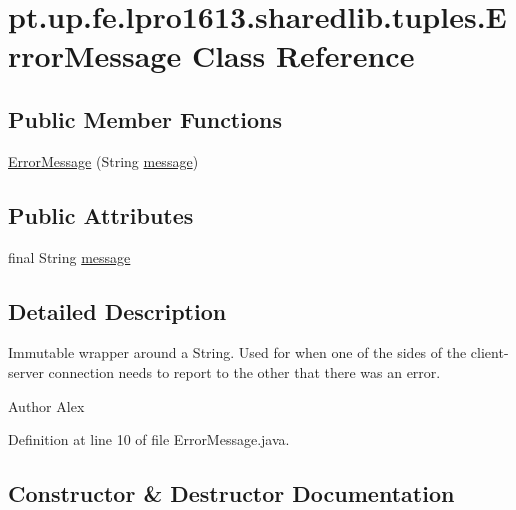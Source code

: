 \hypertarget{classpt_1_1up_1_1fe_1_1lpro1613_1_1sharedlib_1_1tuples_1_1_error_message}{}\section{pt.\+up.\+fe.\+lpro1613.\+sharedlib.\+tuples.\+Error\+Message Class Reference}
\label{classpt_1_1up_1_1fe_1_1lpro1613_1_1sharedlib_1_1tuples_1_1_error_message}
\subsection*{Public Member Functions}
\begin{DoxyCompactItemize}
\item 
\hyperlink{classpt_1_1up_1_1fe_1_1lpro1613_1_1sharedlib_1_1tuples_1_1_error_message_ad4c66717ed7a7524c12b7f63ef799a92}{Error\+Message} (String \hyperlink{classpt_1_1up_1_1fe_1_1lpro1613_1_1sharedlib_1_1tuples_1_1_error_message_a7de78ccd240f055c82da94670b9b9355}{message})
\end{DoxyCompactItemize}
\subsection*{Public Attributes}
\begin{DoxyCompactItemize}
\item 
final String \hyperlink{classpt_1_1up_1_1fe_1_1lpro1613_1_1sharedlib_1_1tuples_1_1_error_message_a7de78ccd240f055c82da94670b9b9355}{message}
\end{DoxyCompactItemize}


\subsection{Detailed Description}
Immutable wrapper around a String. Used for when one of the sides of the client-\/server connection needs to report to the other that there was an error.

\begin{DoxyAuthor}{Author}
Alex 
\end{DoxyAuthor}


Definition at line 10 of file Error\+Message.\+java.



\subsection{Constructor \& Destructor Documentation}
\hypertarget{classpt_1_1up_1_1fe_1_1lpro1613_1_1sharedlib_1_1tuples_1_1_error_message_ad4c66717ed7a7524c12b7f63ef799a92}{}\label{classpt_1_1up_1_1fe_1_1lpro1613_1_1sharedlib_1_1tuples_1_1_error_message_ad4c66717ed7a7524c12b7f63ef799a92} 
